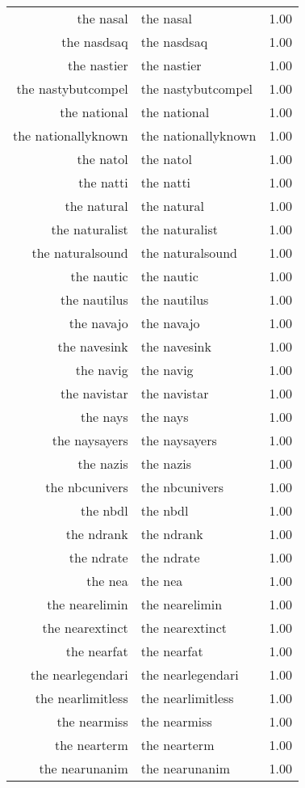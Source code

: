 \begin{table}[ht]
\begin{tabular}{rlr}
  the nasal & the nasal & 1.00 \\ 
  the nasdsaq & the nasdsaq & 1.00 \\ 
  the nastier & the nastier & 1.00 \\ 
  the nastybutcompel & the nastybutcompel & 1.00 \\ 
  the national & the national & 1.00 \\ 
  the nationallyknown & the nationallyknown & 1.00 \\ 
  the natol & the natol & 1.00 \\ 
  the natti & the natti & 1.00 \\ 
  the natural & the natural & 1.00 \\ 
  the naturalist & the naturalist & 1.00 \\ 
  the naturalsound & the naturalsound & 1.00 \\ 
  the nautic & the nautic & 1.00 \\ 
  the nautilus & the nautilus & 1.00 \\ 
  the navajo & the navajo & 1.00 \\ 
  the navesink & the navesink & 1.00 \\ 
  the navig & the navig & 1.00 \\ 
  the navistar & the navistar & 1.00 \\ 
  the nays & the nays & 1.00 \\ 
  the naysayers & the naysayers & 1.00 \\ 
  the nazis & the nazis & 1.00 \\ 
  the nbcunivers & the nbcunivers & 1.00 \\ 
  the nbdl & the nbdl & 1.00 \\ 
  the ndrank & the ndrank & 1.00 \\ 
  the ndrate & the ndrate & 1.00 \\ 
  the nea & the nea & 1.00 \\ 
  the nearelimin & the nearelimin & 1.00 \\ 
  the nearextinct & the nearextinct & 1.00 \\ 
  the nearfat & the nearfat & 1.00 \\ 
  the nearlegendari & the nearlegendari & 1.00 \\ 
  the nearlimitless & the nearlimitless & 1.00 \\ 
  the nearmiss & the nearmiss & 1.00 \\ 
  the nearterm & the nearterm & 1.00 \\ 
  the nearunanim & the nearunanim & 1.00 \\ 

\end{tabular}
\end{table}
